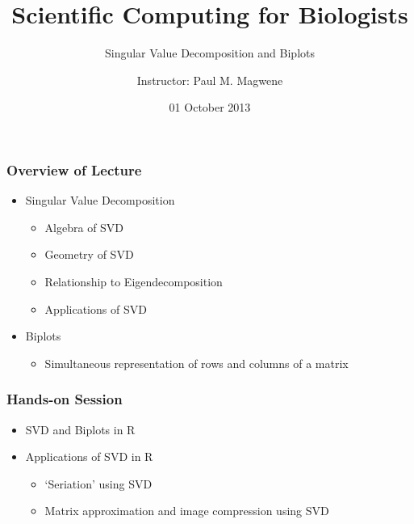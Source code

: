 \documentclass{beamer}
\title{Scientific Computing for Biologists}
\subtitle{Singular Value Decomposition and Biplots}
\author{Instructor: Paul M. Magwene}
\date{01 October 2013}
\begin{document}
\begin{frame}
\titlepage
\end{frame}

\begin{frame}
  \frametitle{Overview of Lecture}
  
\begin{itemize}
		\item Singular Value Decomposition
		\begin{itemize}
			\item Algebra of SVD
			\item Geometry of SVD
			\item Relationship to Eigendecomposition
			\item Applications of SVD			
		\end{itemize}		
		\item Biplots
		\begin{itemize}
			\item Simultaneous representation of rows and columns of a matrix
		\end{itemize}			
\end{itemize}

\end{frame}

\begin{frame}
  \frametitle{Hands-on Session}
\begin{itemize}
    \item SVD and Biplots in R
    \item Applications of SVD in R
    		\begin{itemize}
    		\item `Seriation' using SVD
			  \item Matrix approximation and image compression using SVD
		\end{itemize}
\end{itemize} 


\end{frame}		
\end{document}
